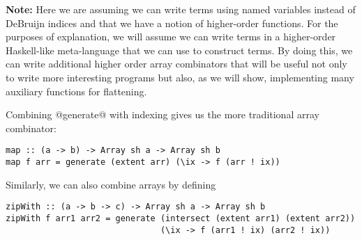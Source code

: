 \begin{aside}
\textbf{Note:} Here we are assuming we can write terms using named variables instead of DeBruijn indices and that we have a notion of higher-order functions. For the purposes of explanation, we will assume we can write terms in a higher-order Haskell-like meta-language that we can use to construct \ndp{} terms. By doing this, we can write additional higher order array combinators that will be useful not only to write more interesting programs but also, as we will show, implementing many auxiliary functions for flattening.
\end{aside}

Combining @generate@ with indexing gives us the more traditional array combinator:
%
\begin{lstlisting}
map :: (a -> b) -> Array sh a -> Array sh b
map f arr = generate (extent arr) (\ix -> f (arr ! ix))
\end{lstlisting}
%
Similarly, we can also combine arrays by defining
%
\begin{lstlisting}
zipWith :: (a -> b -> c) -> Array sh a -> Array sh b
zipWith f arr1 arr2 = generate (intersect (extent arr1) (extent arr2))
                               (\ix -> f (arr1 ! ix) (arr2 ! ix))
\end{lstlisting}


